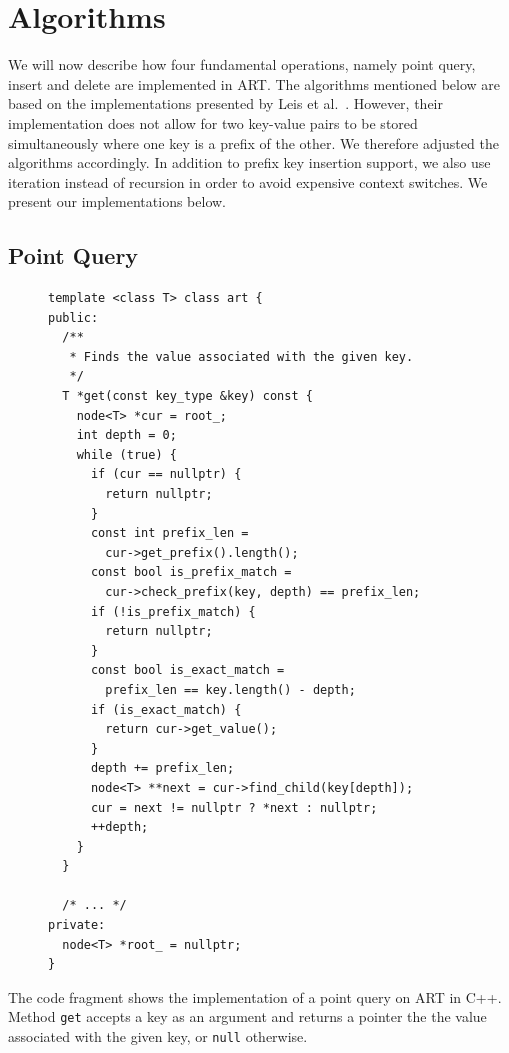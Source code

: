 \documentclass[abstracton,12pt]{scrartcl}
\theoremstyle{definition}
\begin{document}
\section{Algorithms}
\label{sec:algorithms}

We will now describe how four fundamental operations, namely
point query, insert and delete are implemented in ART.
The algorithms mentioned below are based on the implementations presented by
Leis et al.\ \cite{leis2013adaptive}. However, their implementation does not 
allow for two key-value pairs to be stored simultaneously where one key is a 
prefix of the other. We therefore adjusted the algorithms accordingly. In
addition to prefix key insertion support, we also use iteration
instead of recursion in order to avoid expensive context switches. We
present our implementations below.

\subsection{Point Query}
\label{sec:point-query}

\begin{figure}
  \begin{verbatim}
template <class T> class art {
public:
  /**
   * Finds the value associated with the given key.
   */
  T *get(const key_type &key) const {
    node<T> *cur = root_;
    int depth = 0;
    while (true) {
      if (cur == nullptr) {
        return nullptr;
      }
      const int prefix_len = 
        cur->get_prefix().length();
      const bool is_prefix_match = 
        cur->check_prefix(key, depth) == prefix_len;
      if (!is_prefix_match) {
        return nullptr;
      }
      const bool is_exact_match = 
        prefix_len == key.length() - depth;
      if (is_exact_match) {
        return cur->get_value();
      }
      depth += prefix_len;
      node<T> **next = cur->find_child(key[depth]);
      cur = next != nullptr ? *next : nullptr;
      ++depth;
    }
  }

  /* ... */
private:
  node<T> *root_ = nullptr;
}
  \end{verbatim}
  \label{algo:point-query}
\end{figure}

The code fragment shows the implementation of a point query on ART in
C++. Method \texttt{get} accepts a key as an argument and returns a pointer
the the value associated with the given key, or \texttt{null} otherwise.
\end{document}
